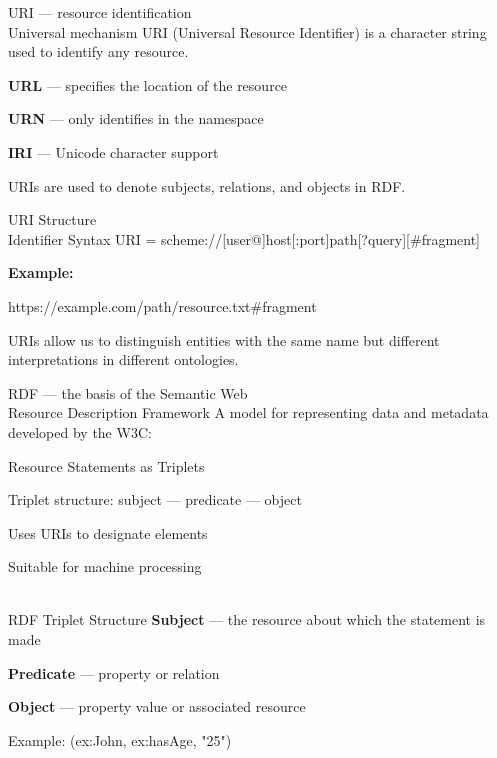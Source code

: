 \begin{frame}{URI --- resource identification\\Universal mechanism}
	\topline
	\justifying
	URI (Universal Resource Identifier) is a character string used to identify any resource.
	
	\begin{textitemize}
		\item \textbf{URL} --- specifies the location of the resource
		\item \textbf{URN} --- only identifies in the namespace
		\item \textbf{IRI} --- Unicode character support
	\end{textitemize}
	
	URIs are used to denote subjects, relations, and objects in RDF.
\end{frame}

\begin{frame}{URI Structure\\Identifier Syntax}
	\topline
	\justifying
	URI = scheme://[user@]host[:port]path[?query][\#fragment]
	
	\vspace{0.5cm}
	\textbf{Example:}
	
	https://example.com/path/resource.txt\#fragment
	
	\vspace{0.5cm}
	URIs allow us to distinguish entities with the same name but different interpretations in different ontologies.
\end{frame}

\begin{frame}{RDF --- the basis of the Semantic Web\\Resource Description Framework}
	\topline
	\justifying
	A model for representing data and metadata developed by the W3C:
	\begin{textitemize}
		\item Resource Statements as Triplets
		\item Triplet structure: subject --- predicate --- object
		\item Uses URIs to designate elements
		\item Suitable for machine processing
	\end{textitemize}
\end{frame}

\begin{frame}{\\RDF Triplet Structure}
	\topline
	\justifying
	\textbf{Subject} --- the resource about which the statement is made
	
	\textbf{Predicate} --- property or relation
	
	\textbf{Object} --- property value or associated resource
	
	\vspace{0.5cm}
	Example: (ex:John, ex:hasAge, "25")
\end{frame}


